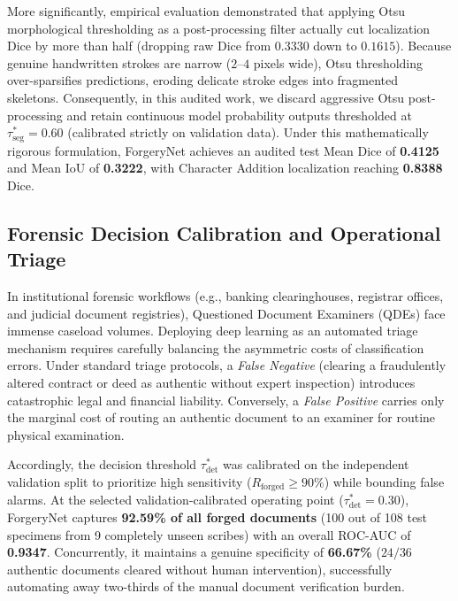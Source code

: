\documentclass[pdflatex,sn-mathphys-num,iicol]{sn-jnl}
\begin{document}
More significantly, empirical evaluation demonstrated that applying Otsu \cite{bib18} morphological thresholding as a post-processing filter actually cut localization Dice by more than half (dropping raw Dice from $0.3330$ down to $0.1615$). Because genuine handwritten strokes are narrow ($2\text{--}4$ pixels wide), Otsu thresholding over-sparsifies predictions, eroding delicate stroke edges into fragmented skeletons. Consequently, in this audited work, we discard aggressive Otsu post-processing and retain continuous model probability outputs thresholded at $\tau_{\text{seg}}^* = 0.60$ (calibrated strictly on validation data). Under this mathematically rigorous formulation, ForgeryNet achieves an audited test Mean Dice of \textbf{0.4125} and Mean IoU of \textbf{0.3222}, with Character Addition localization reaching \textbf{0.8388} Dice.

\subsection{Forensic Decision Calibration and Operational Triage}\label{subsec:calibration}
In institutional forensic workflows (e.g., banking clearinghouses, registrar offices, and judicial document registries), Questioned Document Examiners (QDEs) face immense caseload volumes. Deploying deep learning as an automated triage mechanism requires carefully balancing the asymmetric costs of classification errors. Under standard triage protocols, a \textit{False Negative} (clearing a fraudulently altered contract or deed as authentic without expert inspection) introduces catastrophic legal and financial liability. Conversely, a \textit{False Positive} carries only the marginal cost of routing an authentic document to an examiner for routine physical examination.

Accordingly, the decision threshold $\tau_{\text{det}}^*$ was calibrated on the independent validation split to prioritize high sensitivity ($R_{\text{forged}} \ge 90\%$) while bounding false alarms. At the selected validation-calibrated operating point ($\tau_{\text{det}}^* = 0.30$), ForgeryNet captures \textbf{92.59\% of all forged documents} (100 out of 108 test specimens from 9 completely unseen scribes) with an overall ROC-AUC of \textbf{0.9347}. Concurrently, it maintains a genuine specificity of \textbf{66.67\%} ($24/36$ authentic documents cleared without human intervention), successfully automating away two-thirds of the manual document verification burden.
\end{document}
